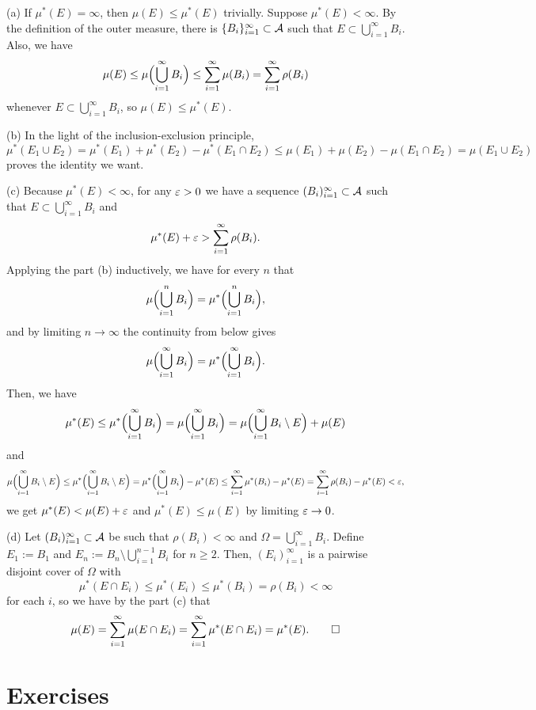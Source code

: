 \documentclass{../note}
\begin{document}
\begin{pf}
(a)
If $\mu^*(E)=\infty$, then $\mu(E)\le\mu^*(E)$ trivially.
Suppose $\mu^*(E)<\infty$.
By the definition of the outer measure, there is $\{B_i\}_{i=1}^\infty\subset\mathcal{A}$ such that $E\subset\bigcup_{i=1}^\infty B_i$.
Also, we have
\[\mu(E)\le\mu\Bigl(\bigcup_{i=1}^\infty B_i\Bigr)\le\sum_{i=1}^\infty\mu(B_i)=\sum_{i=1}^\infty\rho(B_i)\]
whenever $E\subset\bigcup_{i=1}^\infty B_i$, so $\mu(E)\le\mu^*(E)$.

(b)
In the light of the inclusion-exclusion principle,
\[\mu^*(E_1\cup E_2)=\mu^*(E_1)+\mu^*(E_2)-\mu^*(E_1\cap E_2)\le\mu(E_1)+\mu(E_2)-\mu(E_1\cap E_2)=\mu(E_1\cup E_2)\]
proves the identity we want.

(c)
Because $\mu^*(E)<\infty$, for any $\varepsilon>0$ we have a sequence $(B_i)_{i=1}^\infty\subset\mathcal{A}$ such that $E\subset\bigcup_{i=1}^\infty B_i$ and
\[\mu^*(E)+\varepsilon>\sum_{i=1}^\infty\rho(B_i).\]
Applying the part (b) inductively, we have for every $n$ that
\[\mu\Bigl(\bigcup_{i=1}^nB_i\Bigr)=\mu^*\Bigl(\bigcup_{i=1}^nB_i\Bigr),\]
and by limiting $n\to\infty$ the continuity from below gives
\[\mu\Bigl(\bigcup_{i=1}^\infty B_i\Bigr)=\mu^*\Bigl(\bigcup_{i=1}^\infty B_i\Bigr).\]
Then, we have
\[\mu^*(E)\le\mu^*\Bigl(\bigcup_{i=1}^\infty B_i\Bigr)=\mu\Bigl(\bigcup_{i=1}^\infty B_i\Bigr)=\mu\Bigl(\bigcup_{i=1}^\infty B_i\setminus E\Bigr)+\mu(E)\]
and
\[\mu\Bigl(\bigcup_{i=1}^\infty B_i\setminus E\Bigr)\le\mu^*\Bigl(\bigcup_{i=1}^\infty B_i\setminus E\Bigr)=\mu^*\Bigl(\bigcup_{i=1}^\infty B_i\Bigr)-\mu^*(E)\le\sum_{i=1}^\infty\mu^*(B_i)-\mu^*(E)=\sum_{i=1}^\infty\rho(B_i)-\mu^*(E)<\varepsilon,\]
we get $\mu^*(E)<\mu(E)+\varepsilon$ and $\mu^*(E)\le\mu(E)$ by limiting $\varepsilon\to0$.

(d)
Let $(B_i)_{i=1}^\infty\subset\mathcal{A}$ be such that $\rho(B_i)<\infty$ and $\Omega=\bigcup_{i=1}^\infty B_i$.
Define $E_1:=B_1$ and $E_n:=B_n\setminus\bigcup_{i=1}^{n-1}B_i$ for $n\ge2$.
Then, $(E_i)_{i=1}^\infty$ is a pairwise disjoint cover of $\Omega$ with
\[\mu^*(E\cap E_i)\le\mu^*(E_i)\le\mu^*(B_i)=\rho(B_i)<\infty\]
for each $i$, so we have by the part (c) that
\[\mu(E)=\sum_{i=1}^\infty\mu(E\cap E_i)=\sum_{i=1}^\infty\mu^*(E\cap E_i)=\mu^*(E).\qedhere\]
\end{pf}


\section*{Exercises}
\end{document}

